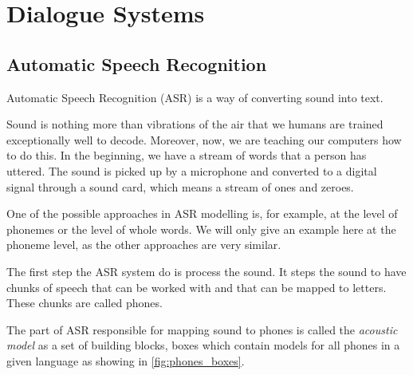 \chapter{Dialogue Systems} \label{chap:dialogue_systems}



\section{Automatic Speech Recognition}

Automatic Speech Recognition (ASR) is a way of converting sound into text.

Sound is nothing more than vibrations of the air that we humans are trained exceptionally well to decode. Moreover, now, we are teaching our computers how to do this. In the beginning, we have a stream of words that a person has uttered. The sound is picked up by a microphone and converted to a digital signal through a sound card, which means a stream of ones and zeroes.

One of the possible approaches in ASR modelling is, for example, at the level of phonemes or the level of whole words. We will only give an example here at the phoneme level, as the other approaches are very similar.

The first step the ASR system do is process the sound. It steps the sound to have chunks of speech that can be worked with and that can be mapped to letters. These chunks are called phones.



The part of ASR responsible for mapping sound to phones is called the \textit{acoustic model} as a set of building blocks, boxes which contain models for all phones in a given language as showing in \cref{fig:phones_boxes}.

